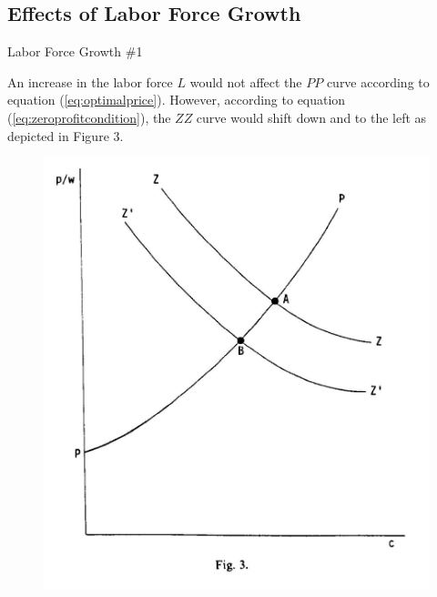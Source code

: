 \documentclass[aspectratio=169]{beamer}
\begin{document}

\subsection{Effects of Labor Force Growth}


\begin{frame}{Labor Force Growth \#1}

An increase in the labor force $ L $ would not affect the $ PP $ curve according to equation (\ref{eq:optimalprice}).  However, according to equation (\ref{eq:zeroprofitcondition}), the $ ZZ $ curve would shift down and to the left as depicted in Figure 3.
\begin{figure}
     \centering
     \includegraphics[scale=0.125]{KrugmanFig3.jpg}
     \label{fig:figure3}
\end{figure}
    
\end{frame}

\end{document}
